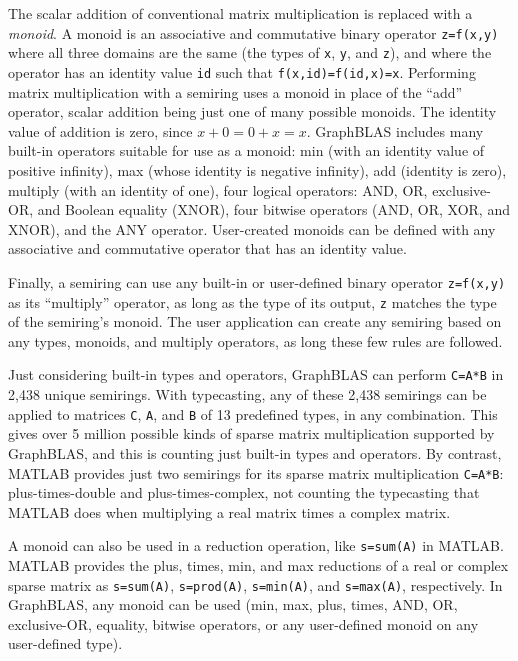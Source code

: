 \documentclass[12pt]{article}
\begin{document}
The scalar addition of conventional matrix multiplication is replaced with a
{\em monoid}.  A monoid is an associative and commutative binary operator
\verb'z=f(x,y)' where all three domains are the same (the types of \verb'x',
\verb'y', and \verb'z'), and where the operator has an identity value \verb'id'
such that \verb'f(x,id)=f(id,x)=x'.  Performing matrix multiplication with a
semiring uses a monoid in place of the ``add'' operator, scalar addition being
just one of many possible monoids.  The identity value of addition is zero,
since $x+0=0+x=x$.   GraphBLAS includes many built-in operators suitable for
use as a monoid: min (with an identity value of positive infinity), max (whose
identity is negative infinity), add (identity is zero), multiply (with an
identity of one), four logical operators: AND, OR, exclusive-OR, and
Boolean equality (XNOR), four bitwise operators (AND, OR, XOR, and XNOR),
and the ANY operator.
User-created monoids can be defined with any associative and
commutative operator that has an identity value.

Finally, a semiring can use any built-in or user-defined binary operator
\verb'z=f(x,y)' as its ``multiply'' operator, as long as the type of its
output, \verb'z' matches the type of the semiring's monoid.
The user application can create any semiring based on any types, monoids,
and multiply operators, as long these few rules are followed.

Just considering built-in types and operators, GraphBLAS can perform
\verb'C=A*B' in 2,438 unique semirings.  With typecasting, any of these 2,438
semirings can be applied to matrices \verb'C', \verb'A', and \verb'B'
of 13 predefined types, in any combination.  This gives over 5 million possible
kinds of sparse matrix multiplication supported by GraphBLAS, and this is
counting just built-in types and operators.  By contrast, MATLAB provides just
two semirings for its sparse matrix multiplication \verb'C=A*B':
plus-times-double and plus-times-complex, not counting the typecasting that
MATLAB does when multiplying a real matrix times a complex matrix.

A monoid can also be used in a reduction operation, like \verb's=sum(A)' in
MATLAB.  MATLAB provides the plus, times, min, and max reductions of a real or
complex sparse matrix as \verb's=sum(A)',  \verb's=prod(A)', \verb's=min(A)',
and \verb's=max(A)', respectively.  In GraphBLAS, any monoid can be used (min,
max, plus, times, AND, OR, exclusive-OR, equality, bitwise operators,
or any user-defined monoid on any user-defined type).
\end{document}
